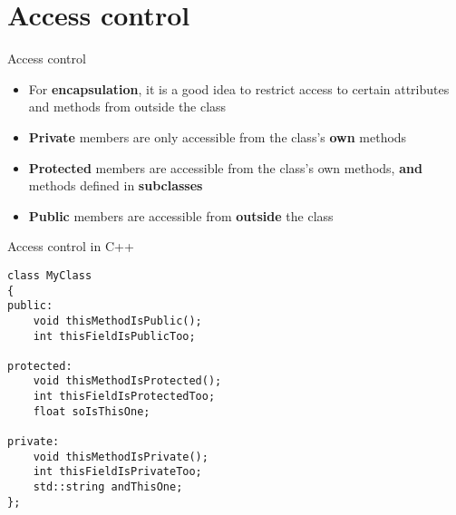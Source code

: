 \part{Access control}
\frame{\partpage}

\begin{frame}{Access control}
\begin{itemize}
	\pause\item For \textbf{encapsulation}, it is a good idea to restrict access to certain attributes and methods from outside the class
	\pause\item \textbf{Private} members are only accessible from the class's \textbf{own} methods
	\pause\item \textbf{Protected} members are accessible from the class's own methods, \textbf{and} methods defined in \textbf{subclasses}
	\pause\item \textbf{Public} members are accessible from \textbf{outside} the class
\end{itemize}
\end{frame}

\begin{frame}[fragile]{Access control in C++}
	\begin{lstlisting}
class MyClass
{
public:
	void thisMethodIsPublic();
	int thisFieldIsPublicToo;

protected:
	void thisMethodIsProtected();
	int thisFieldIsProtectedToo;
	float soIsThisOne;
	
private:
	void thisMethodIsPrivate();
	int thisFieldIsPrivateToo;
	std::string andThisOne;
};
	\end{lstlisting}
\end{frame}

